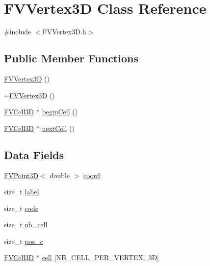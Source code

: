 \hypertarget{classFVVertex3D}{
\section{FVVertex3D Class Reference}
\label{dc/d1d/classFVVertex3D}
}


{\ttfamily \#include $<$FVVertex3D.h$>$}

\subsection*{Public Member Functions}
\begin{DoxyCompactItemize}
\item 
\hyperlink{classFVVertex3D_a87e47c41602f606a2fdd8a76bcc4e1d0}{FVVertex3D} ()
\item 
\hyperlink{classFVVertex3D_a490dbabe5632d460726830d02c2029cf}{$\sim$FVVertex3D} ()
\item 
\hyperlink{classFVCell3D}{FVCell3D} $\ast$ \hyperlink{classFVVertex3D_afedea325600782baa66ee59f2a2898db}{beginCell} ()
\item 
\hyperlink{classFVCell3D}{FVCell3D} $\ast$ \hyperlink{classFVVertex3D_a1b650a928d500886c73dc65f4f5e67cf}{nextCell} ()
\end{DoxyCompactItemize}
\subsection*{Data Fields}
\begin{DoxyCompactItemize}
\item 
\hyperlink{classFVPoint3D}{FVPoint3D}$<$ double $>$ \hyperlink{classFVVertex3D_a1bb13d1bf241b2410a14697f8950f48a}{coord}
\item 
size\_\-t \hyperlink{classFVVertex3D_a1ec973463c76e6d9e91160720959ad68}{label}
\item 
size\_\-t \hyperlink{classFVVertex3D_acf258c3b3328a96e3ee1e3b875b7874f}{code}
\item 
size\_\-t \hyperlink{classFVVertex3D_a1a5a11cfc8bbaa0cf132759c0382da70}{nb\_\-cell}
\item 
size\_\-t \hyperlink{classFVVertex3D_a4a8207cde821dc3afcfb83f8645d62ef}{pos\_\-c}
\item 
\hyperlink{classFVCell3D}{FVCell3D} $\ast$ \hyperlink{classFVVertex3D_aa9ea4588d3e581ba9a3107b7b8a7f781}{cell} \mbox{[}NB\_\-CELL\_\-PER\_\-VERTEX\_\-3D\mbox{]}
\end{DoxyCompactItemize}


